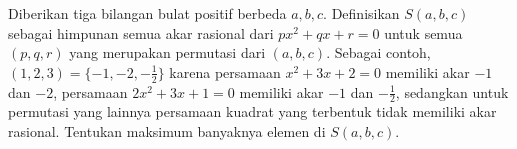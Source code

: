 Diberikan tiga bilangan bulat positif berbeda $a, b, c$. Definisikan $S(a, b, c)$ sebagai himpunan semua akar rasional dari $px^2 + qx + r = 0$ untuk semua $(p, q, r)$ yang merupakan permutasi dari $(a, b, c)$. Sebagai contoh, $(1, 2, 3) = \{-1,-2, -\frac{1}{2}\}$ karena persamaan $x^2 + 3x + 2 = 0$ memiliki akar $-1$ dan $-2$, persamaan $2x^2 + 3x + 1 = 0$ memiliki akar $-1$ dan $-\frac{1}{2}$, sedangkan untuk permutasi yang lainnya persamaan kuadrat yang terbentuk tidak memiliki akar rasional. Tentukan maksimum banyaknya elemen di $S(a, b, c)$.